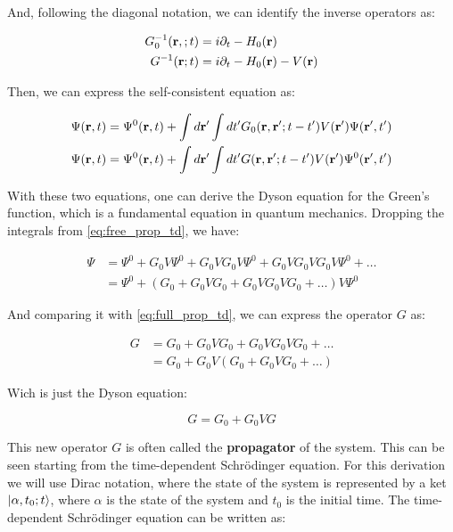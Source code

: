 And, following the diagonal notation, we can identify the inverse operators as:

\begin{align}
    G_0^{-1}(\vb r,;t)&=i\partial_t-H_0(\vb r)
    \\
    G^{-1}(\vb r;t)&=i\partial_t-H_0(\vb r)-V(\vb r)
\end{align}

Then, we can express the self-consistent equation as:

\begin{align}
    \Psi(\vb r,t)=\Psi^0(\vb r,t)+\int d\vb r' \int dt' G_0(\vb r,\vb r';t-t')V(\vb r')\Psi(\vb r',t')\label{eq:free_prop_td}\\
    \Psi(\vb r,t)=\Psi^0(\vb r,t)+\int d\vb r' \int dt' G(\vb r,\vb r';t-t')V(\vb r')\Psi^0(\vb r',t')\label{eq:full_prop_td}
\end{align}

With these two equations, one can derive the Dyson equation for the Green's function, which is a fundamental equation in quantum mechanics. Dropping the integrals from \cref{eq:free_prop_td}, we have:

\begin{align}
    \nonumber \Psi &= \Psi^0 + G_0V\Psi^0+ G_0VG_0V\Psi^0+G_0VG_0VG_0V\Psi^0+\ldots\\
    &= \Psi^0 + (G_0+G_0VG_0+G_0VG_0VG_0+\ldots)V\Psi^0
\end{align}

And comparing it with \cref{eq:full_prop_td}, we can express the operator $G$ as:

\begin{align}
    G &= G_0 + G_0VG_0 + G_0VG_0VG_0 + \ldots\\
    &=G_0 + G_0V (G_0+G_0VG_0+\ldots)
\end{align}

Wich is just the Dyson equation:

\begin{equation}
    G = G_0 + G_0VG
\end{equation}

This new operator $G$ is often called the \textbf{propagator} of the system. This can be seen starting from the time-dependent Schrödinger equation. For this derivation we will use Dirac notation, where the state of the system is represented by a ket $\ket{\alpha,t_0;t}$, where $\alpha$ is the state of the system and $t_0$ is the initial time. The time-dependent Schrödinger equation can be written as:

